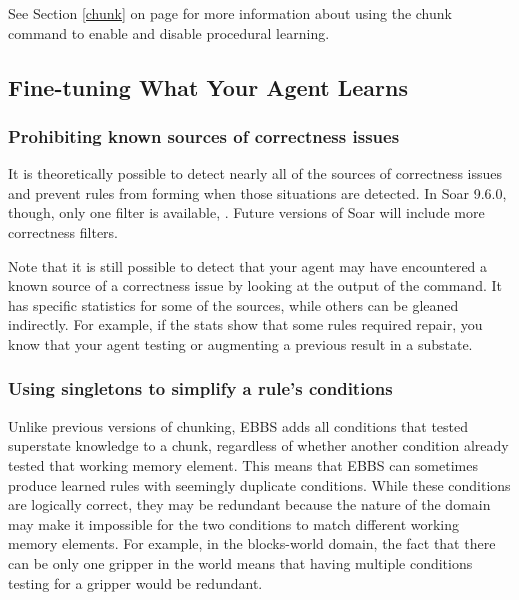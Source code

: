 See Section \ref{chunk} on page \pageref{chunk} for more information about using the chunk command to enable and disable procedural learning.


\subsection{Fine-tuning What Your Agent Learns}
\label{CHUNKING-usage-tuning}

\subsubsection{Prohibiting known sources of correctness issues}
\label{CHUNKING-usage-tuning-correctness}

It is theoretically possible to detect nearly all of the sources of correctness issues and prevent rules from forming when those situations are detected.  In Soar 9.6.0, though, only one filter is available, .  Future versions of Soar will include more correctness filters.

Note that it is still possible to detect that your agent may have encountered a known source of a correctness issue by looking at the output of the  command.  It has specific statistics for some of the sources, while others can be gleaned indirectly.  For example, if the stats show that some rules required repair, you know that your agent testing or augmenting a previous result in a substate.

\subsubsection{Using singletons to simplify a rule's conditions}
\label{CHUNKING-usage-tuning-conditions}

Unlike previous versions of chunking, EBBS adds all conditions that tested superstate knowledge to a chunk, regardless of whether another condition already tested that working memory element.  This means that EBBS can sometimes produce learned rules with seemingly duplicate conditions.  While these conditions are logically correct, they may be redundant because the nature of the domain may make it impossible for the two conditions to match different working memory elements.  For example, in the blocks-world domain, the fact that there can be only one gripper in the world means that having multiple conditions testing for a gripper would be redundant.

